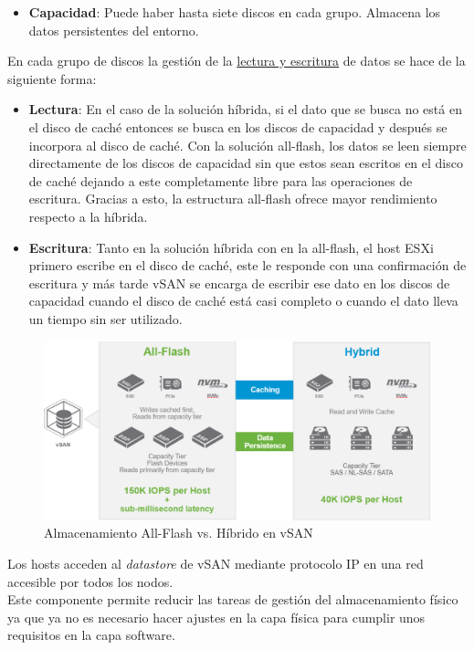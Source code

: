 \begin{itemize}
\begin{itemize}
            \item \textbf{Capacidad}: Puede haber hasta siete discos en cada grupo. Almacena los datos persistentes del entorno.
        \end{itemize}
    En cada grupo de discos la gestión de la \underline{lectura y escritura} de datos se hace de la siguiente forma:
        \begin{itemize}
            \item \textbf{Lectura}: En el caso de la solución híbrida, si el dato que se busca no está en el disco de caché entonces se busca en los discos de capacidad y después se incorpora al disco de caché. Con la solución all-flash, los datos se leen siempre directamente de los discos de capacidad sin que estos sean escritos en el disco de caché dejando a este completamente libre para las operaciones de escritura. Gracias a esto, la estructura all-flash ofrece mayor rendimiento respecto a la híbrida.
            \item \textbf{Escritura}: Tanto en la solución híbrida con en la all-flash, el host ESXi primero escribe en el disco de caché, este le responde con una confirmación de escritura y más tarde vSAN se encarga de escribir ese dato en los discos de capacidad cuando el disco de caché está casi completo o cuando el dato lleva un tiempo sin ser utilizado.
        \end{itemize}
        \begin{figure}[h!]
            \centering
            \includegraphics[width=1\textwidth]{imaxes/cap2recursos/rendimientoVSAN.png}
            \caption{Almacenamiento All-Flash vs. Híbrido en vSAN}
            \label{fig:rendimientoVSAN}
        \end{figure}
        \FloatBarrier
    Los hosts acceden al \textit{datastore} de vSAN mediante protocolo IP en una red accesible por todos los nodos. \\ 
    Este componente permite reducir las tareas de gestión del almacenamiento físico ya que ya no es necesario hacer ajustes en la capa física para cumplir unos requisitos en la capa software.

\end{itemize}
